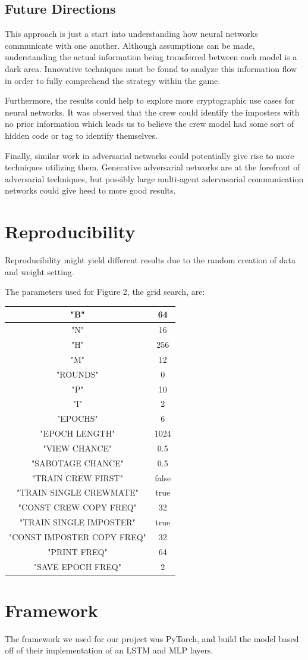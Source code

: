 \documentclass[10pt,twocolumn,letterpaper]{article}
\begin{document}
\subsection{Future Directions}
This approach is just a start into understanding how neural networks
communicate with one another. Although assumptions can be made,
understanding the actual information being transferred between each model is
a dark area. Innovative techniques must be found to analyze this information flow 
in order to fully comprehend the strategy within the game.

Furthermore, the results could help to explore more cryptographic use cases for neural networks.
It was observed that the crew could identify the imposters with no prior information which leads us to
believe the crew model had some sort of hidden code or tag to identify themselves.

Finally, similar work in adversarial networks could potentially give rise to
more techniques utilizing them. Generative adversarial networks are at the forefront of adversarial techniques, but possibly
large multi-agent adervasarial communication networks could give heed to more good results.
{\small


}
\appendix
\section{Reproducibility}
Reproducibility might yield different results due to the random creation of data and
weight setting.

The parameters used for Figure 2, the grid search, are:

\begin{tabular}{ |c|c| } 
\hline 
"B" & 64 \\
\hline
"N" & 16 \\
\hline
"H"& 256 \\
\hline
"M"& 12 \\
\hline
"ROUNDS"& 0 \\
\hline
"P"& 10 \\
\hline
"I"& 2 \\
\hline
"EPOCHS"& 6 \\
\hline
"EPOCH LENGTH"& 1024 \\
\hline
"VIEW CHANCE"& 0.5 \\
\hline
"SABOTAGE CHANCE"& 0.5 \\
\hline
"TRAIN CREW FIRST"& false \\
\hline
"TRAIN SINGLE CREWMATE"& true \\
\hline
"CONST CREW COPY FREQ"& 32 \\
\hline
"TRAIN SINGLE IMPOSTER"& true \\
\hline
"CONST IMPOSTER COPY FREQ"& 32 \\
\hline
"PRINT FREQ"& 64 \\
\hline
"SAVE EPOCH FREQ"& 2 \\
\hline
\end{tabular}
\section{Framework}
The framework we used for our project
was PyTorch, and build the model based off of their implementation
of an LSTM and MLP layers. 
\end{document}
